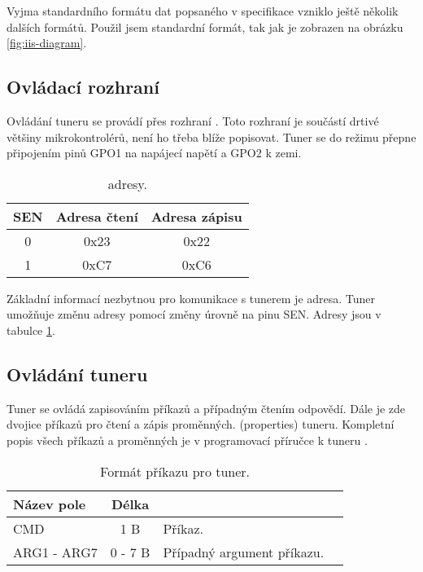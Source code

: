 Vyjma standardního formátu dat popsaného v \iis specifikace \cite{iis} vzniklo ještě několik dalších formátů. Použil jsem standardní formát, tak jak je zobrazen na obrázku \ref{fig:iis-diagram}.


\subsection{Ovládací rozhraní \iic}
Ovládání tuneru se provádí přes rozhraní \iic. Toto rozhraní je součástí drtivé většiny mikrokontrolérů, není ho třeba blíže popisovat. Tuner se do režimu \iic přepne připojením pinů GPO1 na napájecí napětí a GPO2 k zemi.

\begin{table}[ht!]
\begin{center}
\begin{tabular}{|c|c|c|}
\hline 
SEN & Adresa čtení & Adresa zápisu  \\ 
\hline 
0 & 0x23 & 0x22 \\ 
\hline 
1 & 0xC7 & 0xC6 \\ 
\hline 
\end{tabular}
\end{center}
\caption{\iic adresy.}
\label{tab:iic_addresses} 
\end{table}

Základní informací nezbytnou pro komunikace s tunerem je \iic adresa. Tuner umožňuje změnu adresy pomocí změny úrovně na pinu SEN. Adresy jsou v tabulce \ref{tab:iic_addresses}.

\subsection{Ovládání tuneru}
\label{subsec:tuner-control}
Tuner se ovládá zapisováním příkazů a případným čtením odpovědí. Dále je zde dvojice příkazů pro čtení a zápis proměnných. (properties) tuneru. Kompletní popis všech příkazů a proměnných je v programovací příručce k tuneru \cite{tuner-programing}.

\begin{table}[ht!]
\begin{center}
\begin{tabular}{|l|c|l|l|}
\hline 
Název pole & Délka &  \\ 
\hline
CMD & 1 B & Příkaz.\\
\hline
ARG1 - ARG7 & 0 - 7 B & Případný argument příkazu.\\
\hline
\end{tabular} 
\end{center}
\caption{Formát příkazu pro tuner.}
\label{tab:tuner-cmd} 
\end{table}

